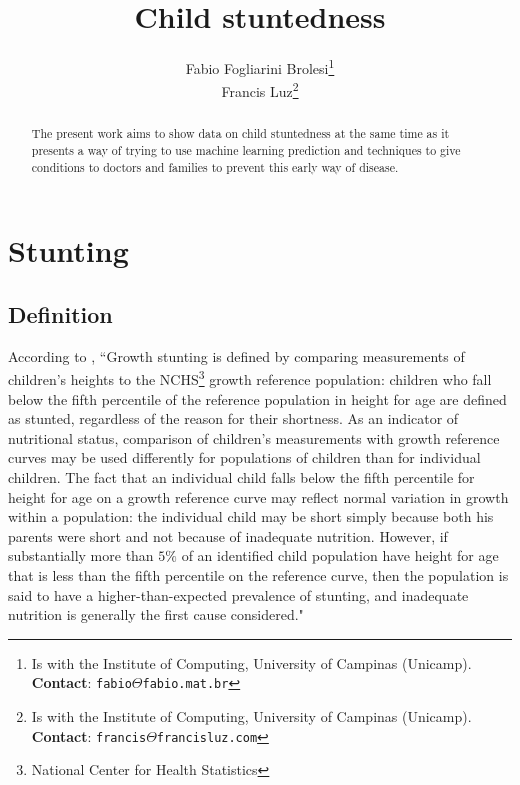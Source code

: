 \documentclass[10pt,twocolumn,letterpaper]{article}
\begin{document}

\title{Child stuntedness}
\author{Fabio Fogliarini Brolesi\thanks{Is with the Institute of Computing, University of Campinas (Unicamp). \textbf{Contact}: \tt\small{fabio$\Theta$fabio.mat.br}}\\
Francis Luz\thanks{Is with the Institute of Computing, University of Campinas (Unicamp). \textbf{Contact}: \tt\small{francis$\Theta$francisluz.com}}
}

\maketitle
\begin{abstract}
The present work aims to show data on child stuntedness at the same time as it presents a way of trying to use machine learning prediction and techniques to give conditions to doctors and families to prevent this early way of disease.
\end{abstract}

\section{Stunting}
\subsection{Definition}
According to \cite{Lewit}, ``Growth stunting is defined by comparing measurements of children's heights to the NCHS\footnote{National Center for Health Statistics} growth reference population: children who fall below the fifth percentile of the reference population in height for age are defined as stunted, regardless of the reason for their shortness. As an indicator of nutritional status, comparison of children's measurements with growth reference curves may be used differently for populations of children than for individual children. The fact that an individual child falls below the fifth percentile for height for age on a growth reference curve may reflect normal variation in growth within a population: the individual child may be short simply because both his parents were short and not because of inadequate nutrition. However, if substantially more than $5\%$ of an identified child population have height for age that is less than the fifth percentile on the reference curve, then the population is said to have a higher-than-expected prevalence of stunting, and inadequate nutrition is generally the first cause considered."
\end{document}
